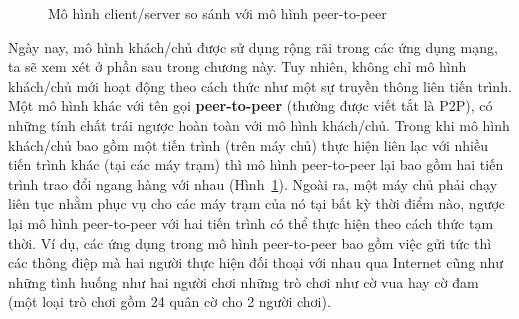 \begin{figure}[tb] 
  \centering {}
  \caption{Mô hình client/server so sánh với mô hình peer-to-peer}
  \label{fig:fig4.6}
\end{figure}

Ngày nay, mô hình khách/chủ được sử dụng rộng rãi trong các ứng dụng mạng, ta sẽ xem xét ở
phần sau trong chương này. Tuy nhiên, không chỉ mô hình khách/chủ mới hoạt động theo cách
thức như một sự truyền thông liên tiến trình. Một mô hình khác với tên gọi
\textbf{peer-to-peer} (thường được viết tắt là P2P), có những tính chất trái ngược hoàn
toàn với mô hình khách/chủ. Trong khi mô hình khách/chủ bao gồm một tiến trình (trên máy
chủ) thực hiện liên lạc với nhiều tiến trình khác (tại các máy trạm) thì mô hình
peer-to-peer lại bao gồm hai tiến trình trao đổi ngang hàng với nhau
(Hình~\ref{fig:fig4.6}). Ngoài ra, một máy chủ phải chạy liên tục nhằm phục vụ cho các máy
trạm của nó tại bất kỳ thời điểm nào, ngược lại mô hình peer-to-peer với hai tiến trình có
thể thực hiện theo cách thức tạm thời. Ví dụ, các ứng dụng trong mô hình peer-to-peer bao
gồm việc gửi tức thì các thông điệp mà hai người thực hiện đối thoại với nhau qua Internet
cũng như những tình huống như hai người chơi những trò chơi như cờ vua hay cờ đam (một
loại trò chơi gồm 24 quân cờ cho 2 người chơi).


